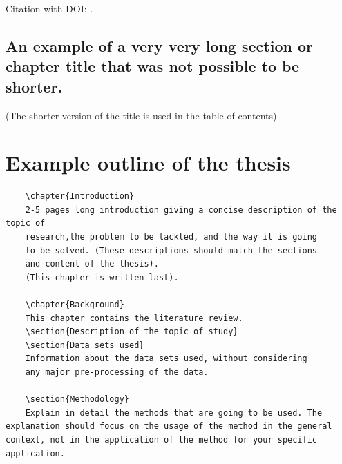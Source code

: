 \documentclass[12pt,MSc,a4paper,oneside]{muthesis}
\begin{document}
Citation with DOI: \cite{Kirschmer:2010:AEI:1958016.1958018}. 


\section[A shorter version of the title]{An example of a very very long section or chapter title that was not possible to be shorter.}

(The shorter version of the title is used in the table of contents)



\chapter{Example outline of the thesis}

\begin{verbatim}
    \chapter{Introduction}
    2-5 pages long introduction giving a concise description of the topic of
    research,the problem to be tackled, and the way it is going
    to be solved. (These descriptions should match the sections
    and content of the thesis).
    (This chapter is written last).
    
    \chapter{Background}
    This chapter contains the literature review.
    \section{Description of the topic of study}
    \section{Data sets used}
    Information about the data sets used, without considering
    any major pre-processing of the data.
    
    \section{Methodology}    
    Explain in detail the methods that are going to be used. The explanation should focus on the usage of the method in the general context, not in the application of the method for your specific application.
    

\end{verbatim}
\end{document}
